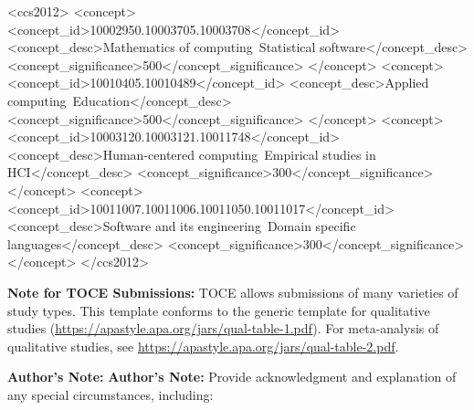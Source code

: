 \documentclass[acmsmall]{acmart}
\begin{document}
%


\begin{CCSXML}
<ccs2012>
<concept>
<concept_id>10002950.10003705.10003708</concept_id>
<concept_desc>Mathematics of computing~Statistical software</concept_desc>
<concept_significance>500</concept_significance>
</concept>
<concept>
<concept_id>10010405.10010489</concept_id>
<concept_desc>Applied computing~Education</concept_desc>
<concept_significance>500</concept_significance>
</concept>
<concept>
<concept_id>10003120.10003121.10011748</concept_id>
<concept_desc>Human-centered computing~Empirical studies in HCI</concept_desc>
<concept_significance>300</concept_significance>
</concept>
<concept>
<concept_id>10011007.10011006.10011050.10011017</concept_id>
<concept_desc>Software and its engineering~Domain specific languages</concept_desc>
<concept_significance>300</concept_significance>
</concept>
</ccs2012>
\end{CCSXML}



%


%
\maketitle

\textbf{Note for TOCE Submissions:} TOCE allows submissions of many varieties of study types. This template conforms to the generic template for qualitative studies (\url{https://apastyle.apa.org/jars/qual-table-1.pdf}). For meta-analysis of qualitative studies, see \url{https://apastyle.apa.org/jars/qual-table-2.pdf}. 

\vspace{3mm}
\textbf{Author's Note:} \textbf{Author's Note:} Provide acknowledgment and explanation of any special circumstances, including:
\end{document}
